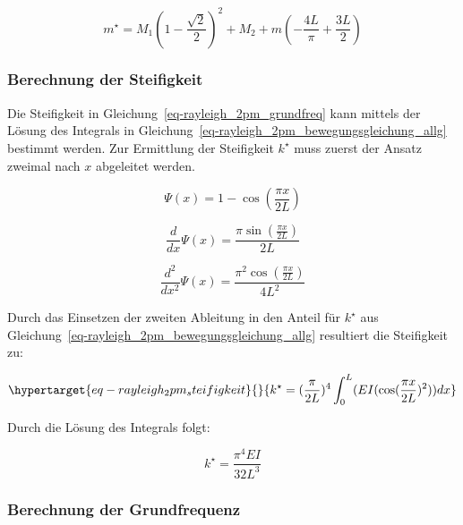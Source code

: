 \documentclass[
  letterpaper,
  DIV=11]{scrreprt}
\begin{document}
\begin{equation}m^{\star} = M_{1} \left(1 - \frac{\sqrt{2}}{2}\right)^{2} + M_{2} + m \left(- \frac{4 L}{\pi} + \frac{3 L}{2}\right)\end{equation}

\hypertarget{berechnung-der-steifigkeit}{%
\subsubsection{Berechnung der
Steifigkeit}\label{berechnung-der-steifigkeit}}

Die Steifigkeit in Gleichung~\ref{eq-rayleigh_2pm_grundfreq} kann
mittels der Lösung des Integrals in
Gleichung~\ref{eq-rayleigh_2pm_bewegungsgleichung_allg} bestimmt werden.
Zur Ermittlung der Steifigkeit \(k^\star\) muss zuerst der Ansatz
zweimal nach \(x\) abgeleitet werden.

\begin{equation}\Psi{\left(x \right)} = 1 - \cos{\left(\frac{\pi x}{2 L} \right)}\end{equation}

\begin{equation}\frac{d}{d x} \Psi{\left(x \right)} = \frac{\pi \sin{\left(\frac{\pi x}{2 L} \right)}}{2 L}\end{equation}

\begin{equation}\frac{d^{2}}{d x^{2}} \Psi{\left(x \right)} = \frac{\pi^{2} \cos{\left(\frac{\pi x}{2 L} \right)}}{4 L^{2}}\end{equation}

Durch das Einsetzen der zweiten Ableitung in den Anteil für \(k^\star\)
aus Gleichung~\ref{eq-rayleigh_2pm_bewegungsgleichung_allg} resultiert
die Steifigkeit zu:

\begin{equation}\protect\hypertarget{eq-rayleigh_2pm_steifigkeit}{}{
k^\star = (\frac{\pi}{2L})^4 \int_0^L(EI(\cos(\frac{\pi x}{2L})^2)) dx
}\label{eq-rayleigh_2pm_steifigkeit}\end{equation}

Durch die Lösung des Integrals folgt:

\begin{equation}k^{\star} = \frac{\pi^{4} E I}{32 L^{3}}\end{equation}

\hypertarget{berechnung-der-grundfrequenz}{%
\subsubsection{Berechnung der
Grundfrequenz}\label{berechnung-der-grundfrequenz}}
\end{document}
